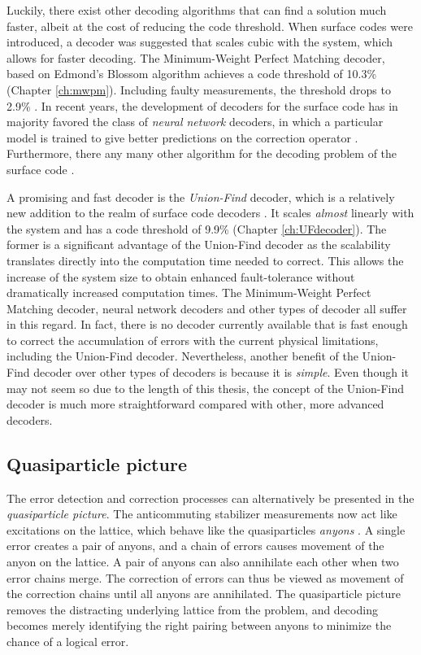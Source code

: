 Luckily, there exist other decoding algorithms that can find a solution much faster, albeit at the cost of reducing the code threshold. When surface codes were introduced, a decoder was suggested that scales cubic with the system, which allows for faster decoding. The Minimum-Weight Perfect Matching decoder, based on Edmond's Blossom algorithm achieves a code threshold of 10.3\% (Chapter \ref{ch:mwpm}). Including faulty measurements, the threshold drops to 2.9\%  \cite{dennis2002topological}. In recent years, the development of decoders for the surface code has in majority favored the class of \emph{neural network} decoders, in which a particular model is trained to give better predictions on the correction operator \cite{breuckmann2018scalable, nautrup2019optimizing, varsamopoulos2017decoding, varsamopoulos2020decoding}. Furthermore, there any many other algorithm for the decoding problem of the surface code \cite{anwar2014fast, duclos2010fast, herold2015cellular, hutter2014efficient, watson2015fast, wootton2012high}.

A promising and fast decoder is the \emph{Union-Find} decoder, which is a relatively new addition to the realm of surface code decoders \cite{delfosse2017almost}. It scales \emph{almost} linearly with the system and has a code threshold of 9.9\% (Chapter \ref{ch:UFdecoder}). The former is a significant advantage of the Union-Find decoder as the scalability translates directly into the computation time needed to correct. This allows the increase of the system size to obtain enhanced fault-tolerance without dramatically increased computation times. The Minimum-Weight Perfect Matching decoder, neural network decoders and other types of decoder all suffer in this regard. In fact, there is no decoder currently available that is fast enough to correct the accumulation of errors with the current physical limitations, including the Union-Find decoder. Nevertheless, another benefit of the Union-Find decoder over other types of decoders is because it is \emph{simple}. Even though it may not seem so due to the length of this thesis, the concept of the Union-Find decoder is much more straightforward compared with other, more advanced decoders. 

\subsection{Quasiparticle picture}\label{sec:quasiparticle}
The error detection and correction processes can alternatively be presented in the \emph{quasiparticle picture}. The anticommuting stabilizer measurements now act like excitations on the lattice, which behave like the quasiparticles \emph{anyons} \cite{kitaev2003fault}. A single error creates a pair of anyons, and a chain of errors causes movement of the anyon on the lattice. A pair of anyons can also annihilate each other when two error chains merge. The correction of errors can thus be viewed as movement of the correction chains until all anyons are annihilated. The quasiparticle picture removes the distracting underlying lattice from the problem, and decoding becomes merely identifying the right pairing between anyons to minimize the chance of a logical error.


